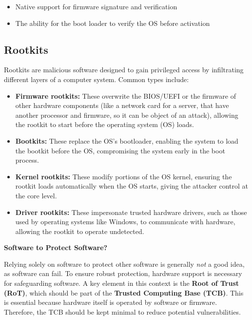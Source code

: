 \begin{itemize}
    \item Native support for firmware signature and verification
    \item The ability for the boot loader to verify the OS before activation
\end{itemize}

\subsection{Rootkits}

Rootkits are malicious software designed to gain privileged access by infiltrating different layers of a computer system. Common types include:

\begin{itemize}
    \item \textbf{Firmware rootkits:} These overwrite the BIOS/UEFI or the firmware of other hardware components (like a network card for a server, that have another processor and firmware, so it can be object of an attack), allowing the rootkit to start before the operating system (OS) loads.
    
    \item \textbf{Bootkits:} These replace the OS's bootloader, enabling the system to load the bootkit before the OS, compromising the system early in the boot process.
    
    \item \textbf{Kernel rootkits:} These modify portions of the OS kernel, ensuring the rootkit loads automatically when the OS starts, giving the attacker control at the core level.
    
    \item \textbf{Driver rootkits:} These impersonate trusted hardware drivers, such as those used by operating systems like Windows, to communicate with hardware, allowing the rootkit to operate undetected.
\end{itemize}


\begin{boxH}
\textbf{Software to Protect Software?} \bigskip

Relying solely on software to protect other software is generally \textit{not} a good idea, as software can fail. To ensure robust protection, hardware support is necessary for safeguarding software. A key element in this context is the \textbf{Root of Trust (RoT)}, which should be part of the \textbf{Trusted Computing Base (TCB)}. This is essential because hardware itself is operated by software or firmware. Therefore, the TCB should be kept minimal to reduce potential vulnerabilities.

\end{boxH}


